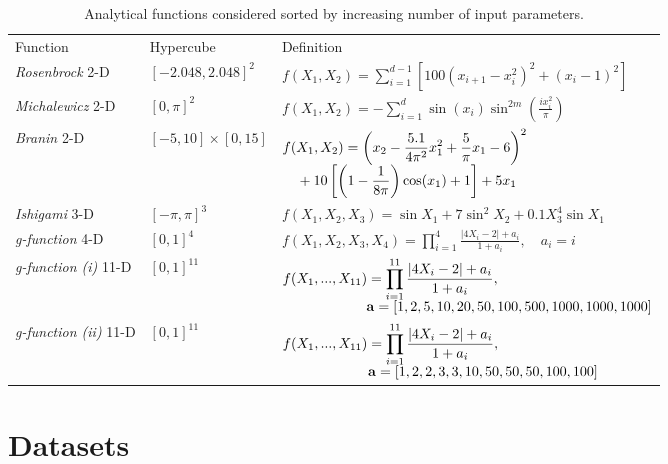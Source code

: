 \begin{table}[h]
\centering
\setcellgapes{5pt}
\makegapedcells
\begin{tabular}{lll}
\toprule
Function&Hypercube & Definition \\
\cmidrule{1-3}
\textit{Rosenbrock} 2-D& $[-2.048, 2.048]^2$ & $
f(X_1, X_2) = \sum_{i = 1}^{d-1}[100(x_{i+1} - x_i^2)^2  +(x_i -1)^2]$\\
\textit{Michalewicz} 2-D& $[0, \pi]^2$ & $
f(X_1, X_2) = -\sum_{i=1}^d \sin(x_i)\sin^{2m}\left(\frac{ix_i^2}{\pi}\right)$\\
\textit{Branin} 2-D& $[-5, 10] \times [0, 15]$ &
$\begin{multlined}[t][0.6\linewidth]
f(X_1, X_2) = \left( x_2 - \frac{5.1}{4\pi^2}x_1^2 + \frac{5}{\pi}x_1 - 6
              \right)^2\\[-1ex]
+ 10 \left[ \left( 1 - \frac{1}{8\pi} \right) \cos(x_1) + 1 \right] + 5x_1\hfill
\end{multlined}$\\
\textit{Ishigami} 3-D& $[-\pi, \pi]^3$ & $ f(X_1, X_2, X_3) = \sin X_1 + 7 \sin^2 X_2 + 0.1 X_3^4 \sin X_1 $\\
\textit{g-function} 4-D& $[0, 1]^4$ & $
f(X_1, X_2, X_3, X_4) = \prod_{i=1}^4 \frac{\lvert 4X_i - 2\rvert + a_i}{1 + a_i}, \quad a_{i} = i$\\
\textit{g-function (i)} 11-D & $[0, 1]^{11}$ & 
$\begin{multlined}[t][0.6\linewidth]
f(X_1, ..., X_{11}) = \prod_{i=1}^{11} \frac{\lvert 4X_i - 2\rvert + a_i}{1 + a_i},\\[-1ex]
\hspace{50pt} \mathbf{a} = [1, 2, 5, 10, 20, 50, 100, 500, 1000, 1000, 1000]\hfill
\end{multlined}$\\
\textit{g-function (ii)} 11-D & $[0, 1]^{11}$ &
$\begin{multlined}[t][0.6\linewidth]
f(X_1, ..., X_{11}) = \prod_{i=1}^{11} \frac{\lvert 4X_i - 2\rvert + a_i}{1 + a_i},\\[-1ex]
\hspace{51pt} \mathbf{a} = [1, 2, 2, 3, 3, 10, 50, 50, 50, 100, 100]\hfill
\end{multlined}$\\
\bottomrule
\end{tabular}
\caption{Analytical functions considered sorted by increasing number of input parameters.}
\label{tab:functions}
\end{table}

\section{Datasets}
\label{sec:dataset}

